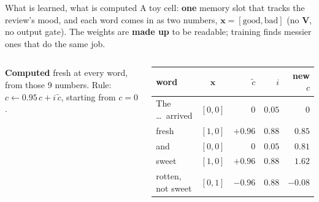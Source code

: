 \documentclass[aspectratio=169]{beamer}
\begin{document}
\begin{frame}{What is learned, what is computed}
  \footnotesize
  A toy cell: \textbf{one} memory slot that tracks the review's mood, and each word comes in as
  two numbers, $\mathbf{x} = [\text{good}, \text{bad}]$ (no $\mathbf{V}$, no output gate). The
  weights are \textbf{made up} to be readable; training finds messier ones that do the same job.
  \vskip 4pt
  \begin{columns}[T]
    \textbf{Computed} fresh at every word, from those 9 numbers. Rule:
    $c \leftarrow 0.95\,c + i\,\tilde{c}$, starting from $c = 0$.
    \vskip 4pt
    \begin{center}
      \renewcommand{\arraystretch}{1.2}
      \begin{tabular}{@{}l c r r r@{}}
        word & $\mathbf{x}$ & $\tilde{c}$ & $i$ & new $c$ \\ \hline
        The \dots\ arrived & $[0, 0]$ & $0$ & $0.05$ & $0$ \\
        fresh & $[1, 0]$ & $+0.96$ & $0.88$ & $0.85$ \\
        and & $[0, 0]$ & $0$ & $0.05$ & $0.81$ \\
        sweet & $[1, 0]$ & $+0.96$ & $0.88$ & $\mathbf{1.62}$ \\ \hline
        \textcolor{armred}{rotten, not sweet} & $[0, 1]$ & \textcolor{armred}{$-0.96$} & $0.88$
          & \textcolor{armred}{$-0.08$} \\
      \end{tabular}
    \end{center}
  \end{columns}
  \vskip 4pt
\end{frame}
\end{document}

